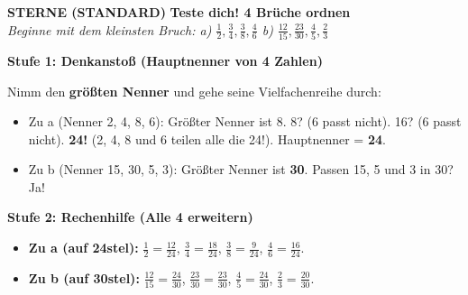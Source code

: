 \documentclass[a4paper,10pt]{article}
\newcommand{\mFrac}[2]{\frac{#1}{#2}}
\begin{document}
\begin{tcolorbox}[
    enhanced, colback=white, colframe=primaryBlue, arc=3mm, boxrule=1.2pt,
    left=4.5mm, right=4.5mm, top=2.5mm, bottom=2.5mm, height=12.9cm
]
    \begin{center}
        {\color{lvlBlue}\textbf{\faStar\faStar{} STERNE (STANDARD)}}\quad
        {\color{primaryBlue}\large\bfseries {}\quad Teste dich! 4 Brüche ordnen}\\[1mm]
        {\footnotesize\textit{Beginne mit dem kleinsten Bruch: \quad a) $\mFrac{1}{2}, \mFrac{3}{4}, \mFrac{3}{8}, \mFrac{4}{6}$ \qquad b) $\mFrac{12}{15}, \mFrac{23}{30}, \mFrac{4}{5}, \mFrac{2}{3}$}}
    \end{center}
    \vspace{0.5mm}

    \begin{tcolorbox}[colback=step1Bg, colframe=step1Border, arc=2mm, boxrule=0.7pt, left=3mm, right=3mm, top=1.8mm, bottom=1.8mm]
        {\color{step1Text}\bfseries\faLightbulb\enskip Stufe 1: Denkanstoß (Hauptnenner von 4 Zahlen)}\\[0.8mm]
        {\small
        Nimm den \textbf{größten Nenner} und gehe seine Vielfachenreihe durch:
        \begin{itemize}[leftmargin=4mm, itemsep=0.2pt, topsep=1pt]
            \item Zu a (Nenner 2, 4, 8, 6): Größter Nenner ist 8. 8? (6 passt nicht). 16? (6 passt nicht). \textbf{24!} (2, 4, 8 und 6 teilen alle die 24!). Hauptnenner = \textbf{24}.
            \item Zu b (Nenner 15, 30, 5, 3): Größter Nenner ist \textbf{30}. Passen 15, 5 und 3 in 30? Ja!
        \end{itemize}
        }
    \end{tcolorbox}
    \vspace{0.8mm}

    \begin{tcolorbox}[colback=step2Bg, colframe=step2Border, arc=2mm, boxrule=0.7pt, left=3mm, right=3mm, top=1.8mm, bottom=1.8mm]
        {\color{step2Text}\bfseries\faSearch\enskip Stufe 2: Rechenhilfe (Alle 4 erweitern)}\\[0.8mm]
        {\small
        \begin{itemize}[leftmargin=4mm, itemsep=0.2pt, topsep=1pt]
            \item \textbf{Zu a (auf 24stel):} $\mFrac{1}{2} = \mFrac{12}{24}$, \quad $\mFrac{3}{4} = \mFrac{18}{24}$, \quad $\mFrac{3}{8} = \mFrac{9}{24}$, \quad $\mFrac{4}{6} = \mFrac{16}{24}$.
            \item \textbf{Zu b (auf 30stel):} $\mFrac{12}{15} = \mFrac{24}{30}$, \quad $\mFrac{23}{30} = \mFrac{23}{30}$, \quad $\mFrac{4}{5} = \mFrac{24}{30}$, \quad $\mFrac{2}{3} = \mFrac{20}{30}$.
        \end{itemize}
        }
    \end{tcolorbox}
    \vspace{0.8mm}


\end{tcolorbox}
\end{document}
